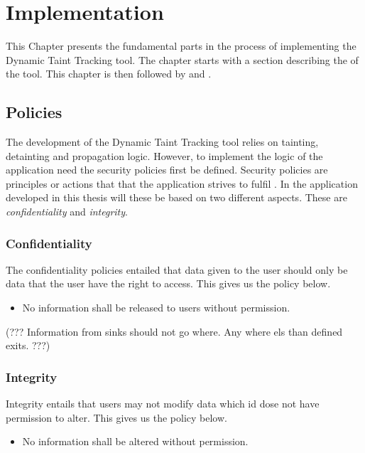 \chapter{Implementation}
This Chapter presents the fundamental parts in the process of implementing the Dynamic Taint Tracking tool. The chapter starts with a section describing the \textit{} of the tool. This chapter is then followed by \textit{} and \textit{}.


\section{Policies}
\label{Policies}
The development of the Dynamic Taint Tracking tool relies on tainting, detainting and propagation logic. However, to implement the logic of the application need the security policies first be defined. Security policies are principles or actions that that the application strives to fulfil \parencite{BayukJenniferL2012Cspg}. In the application developed in this thesis will these be based on two different aspects. These are \textit{confidentiality} and \textit{integrity}.


\subsection{Confidentiality}
The confidentiality policies entailed that data given to the user should only be data that the user have the right to access. This gives us the policy below.

\hfill
\begin{itemize}
	\item No information shall be released to users without permission.
\end{itemize}
\hfill

(??? Information from sinks should not go where. Any where els than defined exits. ???)


\subsection{Integrity}
Integrity entails that users may not modify data which id dose not have permission to alter. This gives us the policy below.

\hfill
\begin{itemize}
	\item No information shall be altered without permission.
\end{itemize}
\hfill

